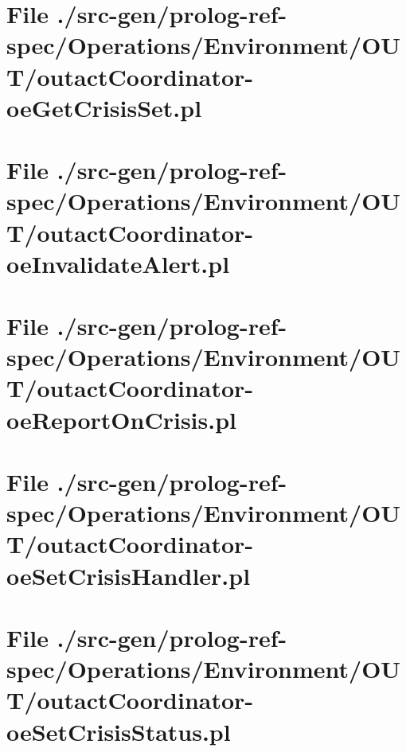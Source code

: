 \section[File /src-gen/prolog-ref-spec/Operations.../outactCoordinator-oeGetCrisisSet.pl]{File ./src-gen/prolog-ref-spec/Operations/Environment/OUT/outactCoordinator-oeGetCrisisSet.pl}
\scriptsize

\normalsize
	
\section[File /src-gen/prolog-ref-spec.../outactCoordinator-oeInvalidateAlert.pl]{File ./src-gen/prolog-ref-spec/Operations/Environment/OUT/outactCoordinator-oeInvalidateAlert.pl}
\scriptsize

\normalsize
	
\section[File /src-gen/prolog-ref-spec.../outactCoordinator-oeReportOnCrisis.pl]{File ./src-gen/prolog-ref-spec/Operations/Environment/OUT/outactCoordinator-oeReportOnCrisis.pl}
\scriptsize

\normalsize
	
\section[File /src-gen/prolog-ref-spec.../outactCoordinator-oeSetCrisisHandler.pl]{File ./src-gen/prolog-ref-spec/Operations/Environment/OUT/outactCoordinator-oeSetCrisisHandler.pl}
\scriptsize

\normalsize
	
\section[File /src-gen/prolog-ref-spec.../outactCoordinator-oeSetCrisisStatus.pl]{File ./src-gen/prolog-ref-spec/Operations/Environment/OUT/outactCoordinator-oeSetCrisisStatus.pl}
\scriptsize

\normalsize
	
